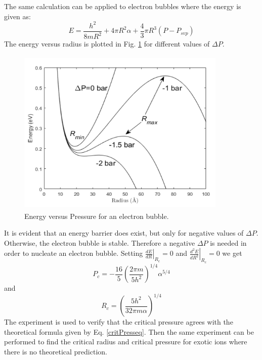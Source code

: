 The same calculation can be applied to electron bubbles where the energy is given as:
\begin{equation}\label{energyEq}
E=\frac{h^2}{8mR^2}+4\pi R^2\alpha + \frac{4}{3}\pi R^3 (P-P_{svp})
\end{equation}
The energy versus radius is plotted in Fig. \ref{bubble_energyBarrier} for different values of $\Delta P$.
\begin{figure}[H]
\centering 
\includegraphics[width=100mm, height=80mm]{Nucleation_Experiment/bubble_energyBarrier.png}
\caption{Energy versus Pressure for an electron bubble. \cite{Yang2018thesis}}
\label{bubble_energyBarrier}
\end{figure}
It is evident that an energy barrier does exist, but only for negative values of $\Delta P$. Otherwise, the electron bubble is stable. Therefore a negative $\Delta P$ is needed in order to nucleate an electron bubble.
Setting $\left.\frac{dE}{dR}\right|_{R_c} = 0$ and $\left.\frac{d^2E}{dR^2}\right|_{R_c} = 0$ we get
\begin{equation}\label{critPresseq}
P_c=-\frac{16}{5}\left(\frac{2\pi m}{5h^2}\right)^{1/4}\alpha^{5/4}
\end{equation}
and
\begin{equation}\label{critRadeq}
R_c = \left(\frac{5h^2}{32\pi m\alpha}\right)^{1/4}
\end{equation}
The experiment is used to verify that the critical pressure agrees with the theoretical formula given by Eq. \ref{critPresseq}. Then the same experiment can be performed to find the critical radius and critical pressure for exotic ions where there is no theoretical prediction.

